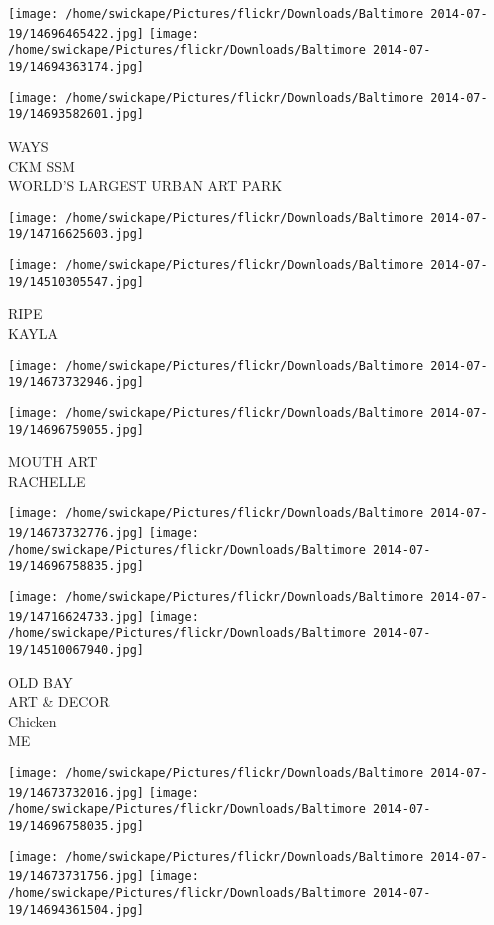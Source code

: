 \documentclass[10pt,letterpaper]{article}
\begin{document}
\texttt{[image: /home/swickape/Pictures/flickr/Downloads/Baltimore 2014-07-19/14696465422.jpg]}
\texttt{[image: /home/swickape/Pictures/flickr/Downloads/Baltimore 2014-07-19/14694363174.jpg]}

\texttt{[image: /home/swickape/Pictures/flickr/Downloads/Baltimore 2014-07-19/14693582601.jpg]}

WAYS\\
CKM SSM\\
WORLD'S LARGEST URBAN ART PARK
\pagebreak

\texttt{[image: /home/swickape/Pictures/flickr/Downloads/Baltimore 2014-07-19/14716625603.jpg]}

\vspace{0.25in}
\texttt{[image: /home/swickape/Pictures/flickr/Downloads/Baltimore 2014-07-19/14510305547.jpg]}

RIPE\\
KAYLA
\pagebreak

\texttt{[image: /home/swickape/Pictures/flickr/Downloads/Baltimore 2014-07-19/14673732946.jpg]}

\vspace{0.25in}
\texttt{[image: /home/swickape/Pictures/flickr/Downloads/Baltimore 2014-07-19/14696759055.jpg]}

MOUTH ART\\
RACHELLE
\pagebreak

\texttt{[image: /home/swickape/Pictures/flickr/Downloads/Baltimore 2014-07-19/14673732776.jpg]}
\texttt{[image: /home/swickape/Pictures/flickr/Downloads/Baltimore 2014-07-19/14696758835.jpg]}

\texttt{[image: /home/swickape/Pictures/flickr/Downloads/Baltimore 2014-07-19/14716624733.jpg]}
\texttt{[image: /home/swickape/Pictures/flickr/Downloads/Baltimore 2014-07-19/14510067940.jpg]}

OLD BAY\\
ART \& DECOR\\
Chicken\\
ME
\pagebreak

\texttt{[image: /home/swickape/Pictures/flickr/Downloads/Baltimore 2014-07-19/14673732016.jpg]}
\texttt{[image: /home/swickape/Pictures/flickr/Downloads/Baltimore 2014-07-19/14696758035.jpg]}

\texttt{[image: /home/swickape/Pictures/flickr/Downloads/Baltimore 2014-07-19/14673731756.jpg]}
\texttt{[image: /home/swickape/Pictures/flickr/Downloads/Baltimore 2014-07-19/14694361504.jpg]}
\end{document}
